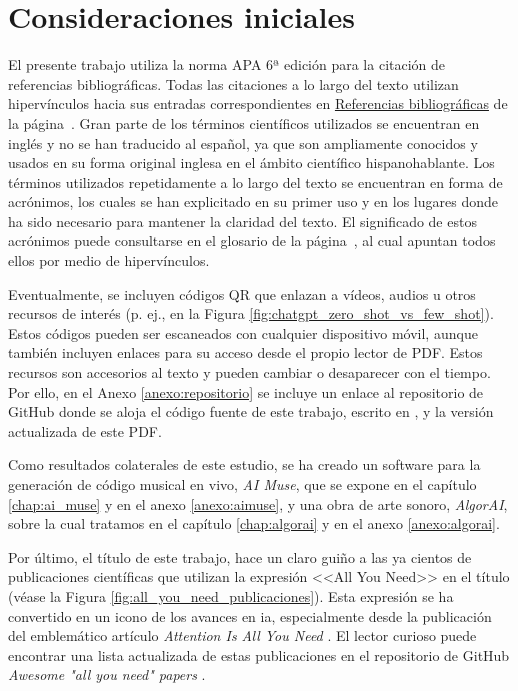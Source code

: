\section{Consideraciones iniciales}

El presente trabajo utiliza la norma APA 6ª edición para la citación de referencias bibliográficas. Todas las citaciones a lo largo del texto utilizan hipervínculos hacia sus entradas correspondientes en \hyperref[chap:referencias]{Referencias bibliográficas} de la página~\pageref{chap:referencias}. Gran parte de los términos científicos utilizados se encuentran en inglés y no se han traducido al español, ya que son ampliamente conocidos y usados en su forma original inglesa en el ámbito científico hispanohablante. Los términos utilizados repetidamente a lo largo del texto se encuentran en forma de acrónimos, los cuales se han explicitado en su primer uso y en los lugares donde ha sido necesario para mantener la claridad del texto. El significado de estos acrónimos puede consultarse en el glosario de la página~\pageref{chap:glosario}, al cual apuntan todos ellos por medio de hipervínculos.

Eventualmente, se incluyen códigos QR que enlazan a vídeos, audios u otros recursos de interés (p. ej., en la Figura \ref{fig:chatgpt_zero_shot_vs_few_shot}). Estos códigos pueden ser escaneados con cualquier dispositivo móvil, aunque también incluyen enlaces para su acceso desde el propio lector de PDF. Estos recursos son accesorios al texto y pueden cambiar o desaparecer con el tiempo. Por ello, en el Anexo \ref{anexo:repositorio} se incluye un enlace al repositorio de GitHub donde se aloja el código fuente de este trabajo, escrito en , y la versión actualizada de este PDF.

Como resultados colaterales de este estudio, se ha creado un software para la generación de código musical en vivo, \emph{AI Muse}, que se expone en el capítulo \ref{chap:ai_muse} y en el anexo \ref{anexo:aimuse}, y una obra de arte sonoro, \emph{AlgorAI}, sobre la cual tratamos en el capítulo \ref{chap:algorai} y en el anexo \ref{anexo:algorai}.

Por último, el título de este trabajo, hace un claro guiño a las ya cientos de publicaciones científicas que utilizan la expresión <<All You Need>> en el título (véase la Figura \ref{fig:all_you_need_publicaciones}). Esta expresión se ha convertido en un icono de los avances en \gls{ia}, especialmente desde la publicación del emblemático artículo \emph{Attention Is All You Need} \citep{vaswaniAttentionAllYou2017}. El lector curioso puede encontrar una lista actualizada de estas publicaciones en el repositorio de GitHub \emph{Awesome "all you need" papers} \citep{nishiKentoNishiAwesomeallyouneedpapers2024}.


